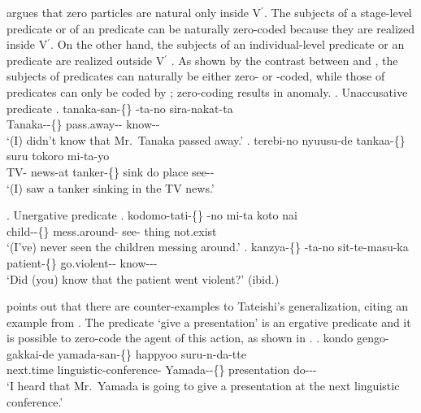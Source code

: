  argues that zero particles are natural only inside V$^{\prime}$.
The subjects of a stage-level predicate or of an  predicate can be naturally zero-coded
because they are realized inside V$^{\prime}$.
On the other hand, the subjects of an individual-level predicate or an  predicate
are realized outside V$^{\prime}$ \cite[see also][56--57]{kageyama93}.
As shown by the contrast between \Next and \NNext,
the subjects of  predicates \Next can naturally be either zero- or -coded,
while those of  predicates \NNext can only be coded by ;
zero-coding results in anomaly.
%
\ex. Unaccusative predicate
 \ag. tanaka-san-\{\} -ta-no sira-nakat-ta \\
      Tanaka--\{\} pass.away-- know-- \\
      `(I) didn't know that Mr.~Tanaka passed away.'
 \bg. terebi-no nyuusu-de tankaa-\{\}  suru tokoro mi-ta-yo \\
      TV- news-at tanker-\{\} sink do place see-- \\
      `(I) saw a tanker sinking in the TV news.'
      \hfill{\cite[56]{kageyama93}}

\ex. Unergative predicate
 \ag. kodomo-tati-\{\} -no mi-ta koto nai \\
      child--\{\} mess.around- see- thing not.exist \\
      `(I've) never seen the children messing around.'
 \bg. kanzya-\{\} -ta-no sit-te-masu-ka \\
      patient-\{\} go.violent-- know--- \\
      `Did (you) know that the patient went violent?'
      \hfill{(ibid.)}


 points out that there are counter-examples to Tateishi's generalization,
citing an example from .
The predicate  `give a presentation' is an ergative predicate and it is possible to zero-code the agent of this action,
as shown in \Next.
%
\exg. kondo gengo-gakkai-de yamada-san-\{\} happyoo suru-n-da-tte \\
      next.time linguistic-conference- Yamada--\{\} presentation do--- \\
      `I heard that Mr.~Yamada is going to give a presentation at the next linguistic conference.'
      \hfill{\cite[49]{niwa89}}

